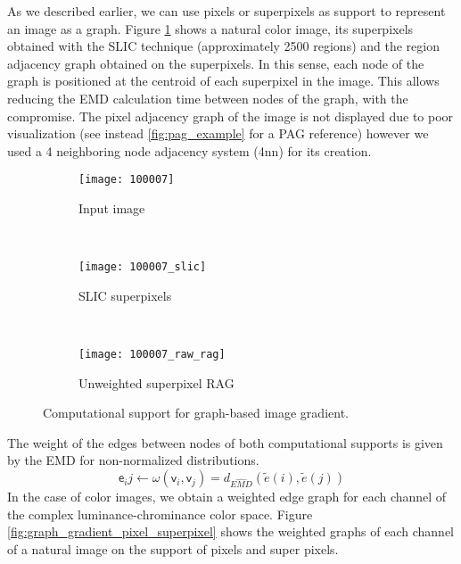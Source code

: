 As we described earlier, we can use pixels or superpixels as support to represent an image as a graph. Figure \ref{fig:computational_support} shows a natural color image, its superpixels obtained with the SLIC technique (approximately 2500 regions) and the region adjacency graph obtained on the superpixels. In this sense, each node of the graph is positioned at the centroid of each superpixel in the image. This allows reducing the EMD calculation time between nodes of the graph, with the compromise. The pixel adjacency graph of the image is not displayed due to poor visualization (see instead \ref{fig:pag_example} for a PAG reference) however we used a 4 neighboring node adjacency system (4nn) for its creation.

\begin{figure}[!ht]
    \centering
    \begin{subfigure}[b]{0.3\textwidth}
    	\texttt{[image: 100007]} 
    	\caption{Input image}
    \end{subfigure}      
    ~ %
    \begin{subfigure}[b]{0.3\textwidth}
        \texttt{[image: 100007\_slic]}
        \caption{SLIC superpixels}
    \end{subfigure}
    ~ %
    \begin{subfigure}[b]{0.3\textwidth}
        \texttt{[image: 100007\_raw\_rag]}
        \caption{Unweighted superpixel RAG}
    \end{subfigure}
    
	\caption{Computational support for graph-based image gradient.}\label{fig:computational_support}    
\end{figure}

The weight of the edges between nodes of both computational supports is given by the EMD for non-normalized distributions. 
\begin{equation}
	\mathsf{e}_ij \leftarrow \omega(\mathsf{v}_i, \mathsf{v}_j) = d_{\widehat{EMD}}(\widetilde{e}(i), \widetilde{e}(j))
\end{equation}
In the case of color images, we obtain a weighted edge graph for each channel of the complex luminance-chrominance color space. Figure \ref{fig:graph_gradient_pixel_superpixel} shows the weighted graphs of each channel of a natural image on the support of pixels and super pixels.

